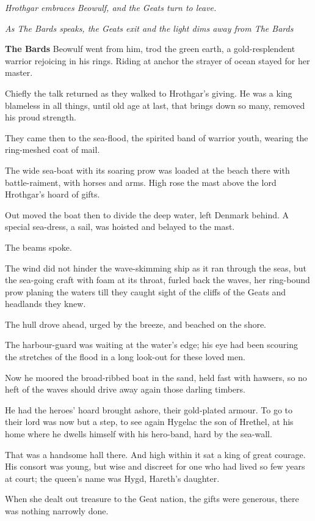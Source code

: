 \documentclass[a4paper]{article}
\begin{document}
{\centerline{\textit{Hrothgar embraces Beowulf, and the Geats turn to leave.}}
\centerline{\textit{As The Bards speaks, the Geats exit and the light dims away from The Bards}}

\textbf{The Bards}  Beowulf went from him,
trod the green earth, a gold-resplendent warrior
rejoicing in his rings. Riding at anchor
the strayer of ocean stayed for her master.

Chiefly the talk returned as they walked
to Hrothgar's giving. He was a king
blameless in all things, until old age at last,
that brings down so many, removed his proud strength.

They came then to the sea-flood, the spirited band
of warrior youth, wearing the ring-meshed
coat of mail.

The wide sea-boat with its soaring prow
was loaded at the beach there with battle-raiment,
with horses and arms. High rose the mast
above the lord Hrothgar's hoard of gifts.

Out moved the boat then
to divide the deep water, left Denmark behind.
A special sea-dress, a sail, was hoisted
and belayed to the mast. 

The beams spoke.

The wind did not hinder the wave-skimming ship
as it ran through the seas, but the sea-going craft
with foam at its throat, furled back the waves,
her ring-bound prow planing the waters
till they caught sight of the cliffs of the Geats
and headlands they knew. 

The hull drove ahead,
urged by the breeze, and beached on the shore.

The harbour-guard was waiting at the water's edge;
his eye had been scouring the stretches of the flood
in a long look-out for these loved men.

Now he moored the broad-ribbed boat in the sand,
held fast with hawsers, so no heft of the waves
should drive away again those darling timbers.

\newpage
He had the heroes' hoard brought ashore,
their gold-plated armour. To go to their lord
was now but a step, to see again Hygelac
the son of Hrethel, at his home where he dwells
himself with his hero-band, hard by the sea-wall.

That was a handsome hall there. And high within it sat
a king of great courage. His consort was young,
but wise and discreet for one who had lived
so few years at court; the queen's name was Hygd,
Hareth's daughter. 

When she dealt out treasure
to the Geat nation, the gifts were generous,
there was nothing narrowly done.

}
\end{document}
